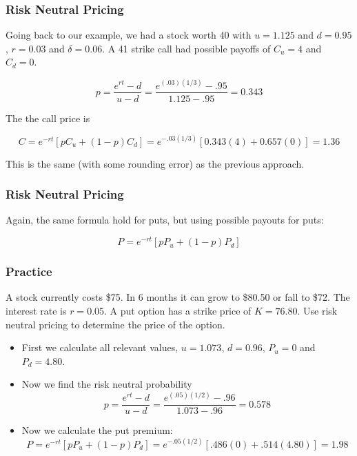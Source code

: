 \documentclass{beamer}
\theoremstyle{plain}
\theoremstyle{definition}
\theoremstyle{remark}
\begin{document}
\begin{frame}
\frametitle{Risk Neutral Pricing}

Going back to our example, we had a stock worth 40 with $u = 1.125$ and $d = 0.95$, $r = 0.03$ and $\delta = 0.06$. A 41 strike call had possible payoffs of $C_u = 4$ and $C_d = 0$. 

\[p =  \frac{e^{rt} - d}{u-d} = \frac{e^{(.03)(1/3)} - .95}{1.125-.95} = 0.343\]

The the call price is 

\[C = e^{-rt}[p C_u + (1-p) C_d] = e^{-.03(1/3)}[0.343(4) + 0.657 (0)] = 1.36 \]

This is the same (with some rounding error) as the previous approach.

\end{frame}

\begin{frame}
\frametitle{Risk Neutral Pricing}

Again, the same formula hold for puts, but using possible payouts for puts:

\[P = e^{-rt}[p P_u + (1-p) P_d]\]

\end{frame}

\begin{frame}
\frametitle{Practice}

A stock currently costs \$75. In 6 months it can grow to \$80.50 or fall to \$72. The interest rate is $r = 0.05$. A put option has a strike price of $K = 76.80$. Use risk neutral pricing to determine the price of the option.

\pause
\begin{itemize}
\item First we calculate all relevant values, $u = 1.073$, $d = 0.96$, $P_u = 0$ and $P_d = 4.80$. 
\pause
\item Now we find the risk neutral probability 
\[p = \frac{e^{rt} - d}{u-d} = \frac{e^{(.05)(1/2)} - .96}{1.073-.96} = 0.578\]
\pause
\item Now we calculate the put premium:
\[P = e^{-rt}[p P_u + (1-p) P_d] = e^{-.05(1/2)}[.486(0) + .514(4.80)] = 1.98\]
\end{itemize}

\end{frame}
\end{document}
